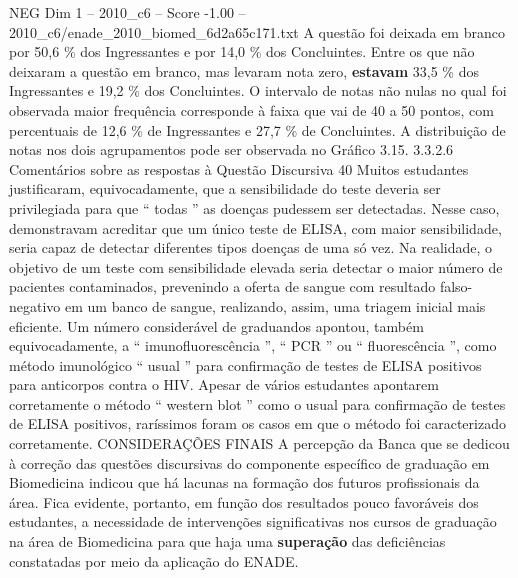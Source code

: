 \begin{textsample}{NEG Dim 1 – 2010\_c6 – Score -1.00 – 2010\_c6/enade\_2010\_biomed\_6d2a65c171.txt}
A questão foi deixada em branco por 50,6 \% dos Ingressantes e por 14,0 \% dos Concluintes.
Entre os que não deixaram a questão em branco, mas levaram nota zero, \textbf{estavam} 33,5 \% dos Ingressantes e 19,2 \% dos Concluintes.
O intervalo de notas não nulas no qual foi observada maior frequência corresponde à faixa que vai de 40 a 50 pontos, com percentuais de 12,6 \% de Ingressantes e 27,7 \% de Concluintes.
A distribuição de notas nos dois agrupamentos pode ser observada no Gráfico 3.15. 3.3.2.6 Comentários sobre as respostas à Questão Discursiva 40 Muitos estudantes justificaram, equivocadamente, que a sensibilidade do teste deveria ser privilegiada para que “ todas ” as doenças pudessem ser detectadas.
Nesse caso, demonstravam acreditar que um único teste de ELISA, com maior sensibilidade, seria capaz de detectar diferentes tipos doenças de uma só vez.
Na realidade, o objetivo de um teste com sensibilidade elevada seria detectar o maior número de pacientes contaminados, prevenindo a oferta de sangue com resultado falso-negativo em um banco de sangue, realizando, assim, uma triagem inicial mais eficiente.
Um número considerável de graduandos apontou, também equivocadamente, a “ imunofluorescência ”, “ PCR ” ou “ fluorescência ”, como método imunológico “ usual ” para confirmação de testes de ELISA positivos para anticorpos contra o HIV.
Apesar de vários estudantes apontarem corretamente o método “ western blot ” como o usual para confirmação de testes de ELISA positivos, raríssimos foram os casos em que o método foi caracterizado corretamente.
CONSIDERAÇÕES FINAIS A percepção da Banca que se dedicou à correção das questões discursivas do componente específico de graduação em Biomedicina indicou que há lacunas na formação dos futuros profissionais da área.
Fica evidente, portanto, em função dos resultados pouco favoráveis dos estudantes, a necessidade de intervenções significativas nos cursos de graduação na área de Biomedicina para que haja uma \textbf{superação} das deficiências constatadas por meio da aplicação do ENADE.

\end{textsample}
